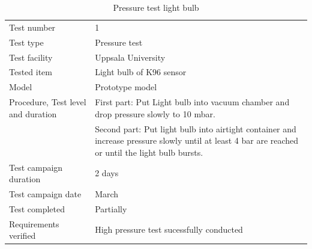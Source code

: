 \documentclass[
  a4paper,
  11pt,
  openany,
  parskip,
  toc=totoc,
  listof=totoc,
  bibliography=totoc
]{scrreprt}
\begin{document}
\begin{table}[H]
\centering
\caption{Pressure test light bulb}
\label{tab:test_pressure_light_bulb}
\begin{tabular}{L{5cm}L{10cm}}
\toprule
Test number & 1 \\
Test type & Pressure test \\
Test facility & Uppsala University \\
Tested item & Light bulb of K96 sensor \\
Model & Prototype model \\
Procedure, Test level and duration & First part: Put Light bulb into vacuum chamber and drop pressure slowly to 10 mbar. \\
& Second part: Put light bulb into airtight container and increase pressure slowly until at least 4 bar are reached or until the light bulb bursts. \\
Test campaign duration & 2 days \\
Test campaign date & March \\
Test completed & Partially \\
Requirements verified & High pressure test sucessfully conducted\\
\bottomrule
\end{tabular}
\end{table}
\end{document}
